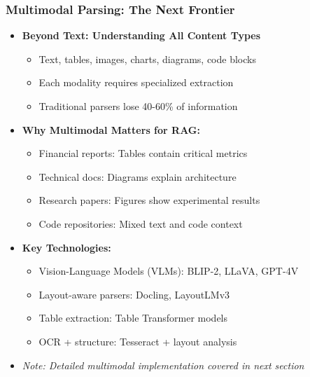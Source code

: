 \begin{frame}[fragile]\frametitle{Multimodal Parsing: The Next Frontier}
      \begin{itemize}
        \item \textbf{Beyond Text: Understanding All Content Types}
        \begin{itemize}
            \item Text, tables, images, charts, diagrams, code blocks
            \item Each modality requires specialized extraction
            \item Traditional parsers lose 40-60\% of information
        \end{itemize}
        \item \textbf{Why Multimodal Matters for RAG:}
        \begin{itemize}
            \item Financial reports: Tables contain critical metrics
            \item Technical docs: Diagrams explain architecture
            \item Research papers: Figures show experimental results
            \item Code repositories: Mixed text and code context
        \end{itemize}
        \item \textbf{Key Technologies:}
        \begin{itemize}
            \item Vision-Language Models (VLMs): BLIP-2, LLaVA, GPT-4V
            \item Layout-aware parsers: Docling, LayoutLMv3
            \item Table extraction: Table Transformer models
            \item OCR + structure: Tesseract + layout analysis
        \end{itemize}
        \item \textit{Note: Detailed multimodal implementation covered in next section}
      \end{itemize}
\end{frame}

